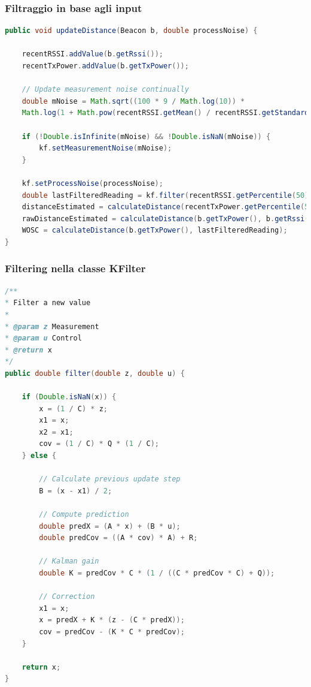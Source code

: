 \subsubsection{Filtraggio in base agli input}
\begin{lstlisting}[language=Java]
public void updateDistance(Beacon b, double processNoise) {
   	
   	recentRSSI.addValue(b.getRssi());
   	recentTxPower.addValue(b.getTxPower());
   	
   	// Update measurement noise continually
   	double mNoise = Math.sqrt((100 * 9 / Math.log(10)) *
   	Math.log(1 + Math.pow(recentRSSI.getMean() / recentRSSI.getStandardDeviation(), 2)));
   	
   	if (!Double.isInfinite(mNoise) && !Double.isNaN(mNoise)) {
   		kf.setMeasurementNoise(mNoise);
   	}
   	
   	kf.setProcessNoise(processNoise);
   	double lastFilteredReading = kf.filter(recentRSSI.getPercentile(50));
   	distanceEstimated = calculateDistance(recentTxPower.getPercentile(50), lastFilteredReading);
   	rawDistanceEstimated = calculateDistance(b.getTxPower(), b.getRssi());
   	WOSC = calculateDistance(b.getTxPower(), lastFilteredReading);
}
\end{lstlisting}

\subsubsection{Filtering nella classe KFilter}\label{ch:kfilter}
\begin{lstlisting}[language=Java]
/**
* Filter a new value
*
* @param z Measurement
* @param u Control
* @return x
*/
public double filter(double z, double u) {
   	
   	if (Double.isNaN(x)) {
   		x = (1 / C) * z;
   		x1 = x;
   		x2 = x1;
   		cov = (1 / C) * Q * (1 / C);
   	} else {
   	
    	// Calculate previous update step
    	B = (x - x1) / 2;
   	
    	// Compute prediction
    	double predX = (A * x) + (B * u);
    	double predCov = ((A * cov) * A) + R;
   	
    	// Kalman gain
    	double K = predCov * C * (1 / ((C * predCov * C) + Q));
    	
    	// Correction
    	x1 = x;
    	x = predX + K * (z - (C * predX));
    	cov = predCov - (K * C * predCov);
	}

	return x;
}
\end{lstlisting}


